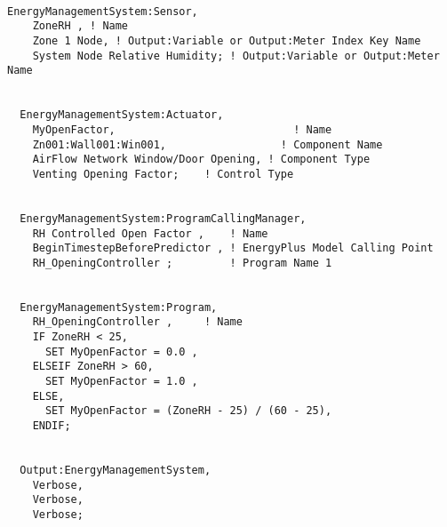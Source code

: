 \begin{lstlisting}

EnergyManagementSystem:Sensor,
    ZoneRH , ! Name
    Zone 1 Node, ! Output:Variable or Output:Meter Index Key Name
    System Node Relative Humidity; ! Output:Variable or Output:Meter Name


  EnergyManagementSystem:Actuator,
    MyOpenFactor,                            ! Name
    Zn001:Wall001:Win001,                  ! Component Name
    AirFlow Network Window/Door Opening, ! Component Type
    Venting Opening Factor;    ! Control Type


  EnergyManagementSystem:ProgramCallingManager,
    RH Controlled Open Factor ,    ! Name
    BeginTimestepBeforePredictor , ! EnergyPlus Model Calling Point
    RH_OpeningController ;         ! Program Name 1


  EnergyManagementSystem:Program,
    RH_OpeningController ,     ! Name
    IF ZoneRH < 25,
      SET MyOpenFactor = 0.0 ,
    ELSEIF ZoneRH > 60,
      SET MyOpenFactor = 1.0 ,
    ELSE,
      SET MyOpenFactor = (ZoneRH - 25) / (60 - 25),
    ENDIF;


  Output:EnergyManagementSystem,
    Verbose,
    Verbose,
    Verbose;
\end{lstlisting}
